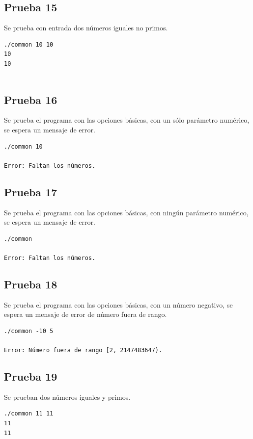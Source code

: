 \documentclass[titlepage,a4paper]{article}
\begin{document}
\subsection{Prueba 15}
Se prueba con entrada dos números iguales no primos.
\begin{lstlisting}[style=test_run_style]
./common 10 10
10
10


\end{lstlisting}

\subsection{Prueba 16}
Se prueba el programa con las opciones básicas, con un sólo parámetro numérico, se espera un mensaje de error.
\begin{lstlisting}[style=test_run_style]
./common 10

Error: Faltan los números.
\end{lstlisting}

\subsection{Prueba 17}
Se prueba el programa con las opciones básicas, con ningún parámetro numérico, se espera un mensaje de error.
\begin{lstlisting}[style=test_run_style]
./common 

Error: Faltan los números.

\end{lstlisting}
\subsection{Prueba 18}

Se prueba el programa con las opciones básicas, con un número negativo, se espera un mensaje de error de número fuera de rango.
\begin{lstlisting}[style=test_run_style]
./common -10 5

Error: Número fuera de rango [2, 2147483647).
\end{lstlisting}

\subsection{Prueba 19}
Se prueban dos números iguales y primos.
\begin{lstlisting}[style=test_run_style]
./common 11 11
11
11

\end{lstlisting}
\end{document}
